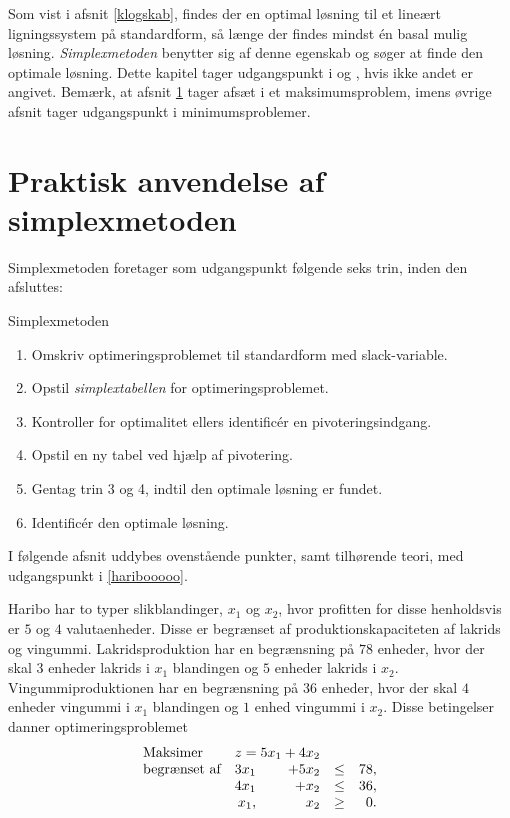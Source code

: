 Som vist i afsnit \ref{klogskab}, findes der en optimal løsning til et lineært ligningssystem på standardform, så længe der findes mindst én basal mulig løsning. 
\textit{Simplexmetoden} benytter sig af denne egenskab og søger at finde den optimale løsning.
Dette kapitel tager udgangspunkt i \citep[side 25-34]{lial} og \citep[side 82-87 og 94-100]{bert}, hvis ikke andet er angivet.
Bemærk, at afsnit \ref{afsnittet} tager afsæt i et maksimumsproblem, imens øvrige afsnit tager udgangspunkt i minimumsproblemer.
%

%
\section{Praktisk anvendelse af simplexmetoden}
\label{afsnittet}
Simplexmetoden foretager som udgangspunkt følgende seks trin, inden den afsluttes:
%
\begin{col}{Simplexmetoden}{}
%
\begin{enumerate}
\item Omskriv optimeringsproblemet til standardform med slack-variable.  %
\item Opstil \textit{simplextabellen} for optimeringsproblemet.					 %
\item Kontroller for optimalitet ellers identificér en pivoteringsindgang.					 %
\item Opstil en ny tabel ved hjælp af pivotering. 						 %
\item Gentag trin 3 og 4, indtil den optimale løsning er fundet. 					 %
\item Identificér den optimale løsning.									 %
\end{enumerate}
%
\end{col}
\noindent
%
I følgende afsnit uddybes ovenstående punkter, samt tilhørende teori, med udgangspunkt i \ref{haribooooo}.
%
\\
%
\begin{eks}
\label{haribooooo}
Haribo har to typer slikblandinger, $x_1$ og $x_2$, hvor profitten for disse henholdsvis er $5$ og $4$ valutaenheder.
Disse er begrænset af produktionskapaciteten af lakrids og vingummi.
Lakridsproduktion har en begrænsning på $78$ enheder, hvor der skal $3$ enheder lakrids i $x_1$ blandingen og $5$ enheder lakrids i $x_2$.
Vingummiproduktionen har en begrænsning på $36$ enheder, hvor der skal $4$ enheder vingummi i $x_1$ blandingen og $1$ enhed vingummi i $x_2$. 
%
Disse betingelser danner optimeringsproblemet
%
\begin{align*}
\begin{array}{lrrlr} 
\text{Maksimer}		&	\multicolumn{2}{c}{z=5x_1+4x_2}  &\\
\text{begrænset af}	&3x_1& +5x_2			&\leq 	&78,\\
					&4x_1& + x_2				&\leq	& 36,\\
					&x_1,& x_2				&\geq	& 0.
\end{array}
\end{align*}
%
\end{eks}
%
